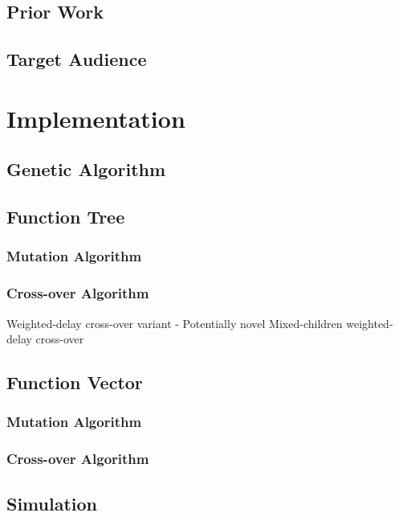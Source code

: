 \documentclass{acm_proc_article-sp}
\begin{document}
    \subsection{Prior Work}

    \subsection{Target Audience}

\section{Implementation}

    \subsection{Genetic Algorithm}

    \subsection{Function Tree}

        \subsubsection{Mutation Algorithm}
        \subsubsection{Cross-over Algorithm}

    Weighted-delay cross-over variant - Potentially novel
    Mixed-children weighted-delay cross-over

    \subsection{Function Vector}
    
        \subsubsection{Mutation Algorithm}
        \subsubsection{Cross-over Algorithm}

    \subsection{Simulation}
    
\end{document}
